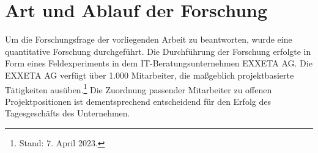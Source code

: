

\section{Art und Ablauf der Forschung}
Um die Forschungsfrage der vorliegenden Arbeit zu beantworten, wurde eine quantitative Forschung durchgeführt.
Die Durchführung der Forschung erfolgte in Form eines Feldexperiments in dem IT-Beratungsunternehmen EXXETA AG.
Die EXXETA AG verfügt über 1.000 Mitarbeiter, die maßgeblich projektbasierte Tätigkeiten ausüben.\footnote{Stand: 7. April 2023.}
Die Zuordnung passender Mitarbeiter zu offenen Projektpositionen ist dementsprechend entscheidend für den Erfolg des Tagesgeschäfts des Unternehmen.

